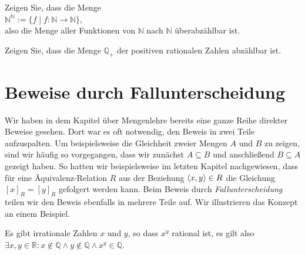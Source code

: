\exercise
Zeigen Sie, dass die Menge
\\[0.2cm]
\hspace*{1.3cm}
$\mathbb{N}^\mathbb{N} := \{ f \mid f: \mathbb{N} \rightarrow \mathbb{N} \}$,
\\[0.2cm]
also die Menge aller Funktionen von $\mathbb{N}$ nach $\mathbb{N}$ überabzählbar ist.
\exend

\exercise
Zeigen Sie, dass die Menge $\mathbb{Q}_+$ der positiven rationalen Zahlen abzählbar ist.
\exend

\section{Beweise durch Fallunterscheidung}
Wir haben in dem Kapitel über Mengenlehre bereits eine ganze Reihe direkter Beweise gesehen.
Dort war es oft notwendig, den Beweis in zwei Teile aufzuspalten.
Um beispielsweise die Gleichheit zweier Mengen $A$ und $B$ zu zeigen, sind wir 
häufig so vorgegangen, dass wir zunächst 
$A \subseteq B$ und anschließend $B \subseteq A$ gezeigt haben.  So hatten wir beispielsweise  im
letzten Kapitel nachgewiesen, dass für eine Äquivalenz-Relation $R$ aus der Beziehung $\pair(x,y) \in R$ die
Gleichung $[x]_R = [y]_R$ gefolgert werden kann.  Beim Beweis durch \emph{Fallunterscheidung} teilen
wir den Beweis ebenfalls in mehrere Teile auf.  Wir illustrieren das Konzept an einem Beispiel.

\begin{Satz}
  Es gibt irrationale Zahlen $x$ und $y$, so dass $x^y$ rational ist, es gilt also
  \\[0.2cm]
  \hspace*{1.3cm}
  $\exists x, y \in \mathbb{R}: x \not\in \mathbb{Q} \wedge y \not\in \mathbb{Q} \wedge x^y \in \mathbb{Q}$.
\end{Satz}

